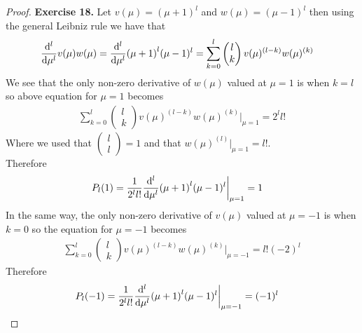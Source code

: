 \documentclass[11pt]{article}
\theoremstyle{definition}
\begin{document}
\cleardoublepage
\begin{proof}{\textbf{Exercise 18.}}
Let $v(\mu) = (\mu + 1)^l$ and $w(\mu) = (\mu - 1)^l$ then using the general
Leibniz rule we have that
\begin{align*}
    \dv[l]{\mu}v(\mu)w(\mu) = 
    \dv[l]{\mu}(\mu + 1)^l(\mu - 1)^l
    &= \sum_{k= 0}^l
    \begin{pmatrix}l\\k\end{pmatrix} v(\mu)^{(l - k)}w(\mu)^{(k)}
\end{align*}
We see that the only non-zero derivative of $w(\mu)$ valued at $\mu = 1$ is
when $k = l$ so above equation for $\mu = 1$ becomes  
\begin{align*}
    \sum_{k= 0}^l
    \begin{pmatrix}l\\k\end{pmatrix} v(\mu)^{(l - k)}w(\mu)^{(k)}\bigg|_{\mu = 1}
    = 2^l l!
\end{align*}
Where we used that $\begin{pmatrix}l\\l\end{pmatrix} = 1$ and that
$w(\mu)^{(l)}|_{\mu = 1} = l!$.\\
Therefore
\begin{align*}
    P_l(1) = \frac{1}{2^ll!}\dv[l]{\mu}(\mu + 1)^l(\mu - 1)^l\bigg|_{\mu = 1}
    &= 1
\end{align*}
In the same way, the only non-zero derivative of $v(\mu)$ valued at $\mu = -1$
is when $k = 0$ so the equation for $\mu = -1$ becomes 
\begin{align*}
    \sum_{k= 0}^l
    \begin{pmatrix}l\\k\end{pmatrix} v(\mu)^{(l - k)}w(\mu)^{(k)}\bigg|_{\mu = -1}
    = l!(-2)^l
\end{align*}
Therefore
\begin{align*}
    P_l(-1) = \frac{1}{2^ll!}\dv[l]{\mu}(\mu + 1)^l(\mu - 1)^l\bigg|_{\mu = -1}
    &= (-1)^l
\end{align*}

\end{proof}
\end{document}
